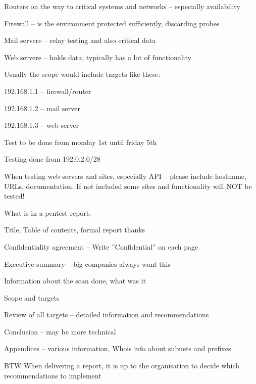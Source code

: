 \documentclass[Screen16to9,17pt]{foils}
\begin{document}


\begin{list2}
\item Routers on the way to critical systems and networks -- especially availability
\item Firewall -- is the environment protected sufficiently, discarding probes
\item Mail servere -- relay testing and also critical data
\item Web servere -- holds data, typically has a lot of functionality
\end{list2}



\begin{list1}
\item Usually the scope would include targets like these:
\begin{list2}
\item 192.168.1.1 -- firewall/router
\item 192.168.1.2 -- mail server
\item 192.168.1.3 -- web server
\item Test to be done from monday 1st until friday 5th
\item Testing done from 192.0.2.0/28
\end{list2}
\item When testing web servers and sites, especially API -- please include hostname, URLs, documentation. If not included some sites and functionality will NOT be tested!
\end{list1}



\begin{list1}
\item What is in a pentest report:
\begin{list2}
\item Title, Table of contents, formal report thanks
\item Confidentiality agreement – Write ”Confidential” on each page
\item Executive summary – big companies always want this
\item Information about the scan done, what was it
\item Scope and targets
\item Review of all targets – detailed information and recommendations
\item Conclusion – may be more technical
\item Appendices – various information, Whois info about subnets and prefixes
\end{list2}
\item BTW When delivering a report, it is up to the organisation to decide which recommendations to implement
\end{list1}
\end{document}
